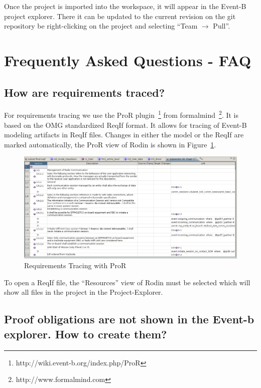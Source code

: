\documentclass[10pt,a4paper]{article}
\begin{document}
Once the project is imported into the workspace, it will appear in the Event-B
project explorer. There it can be updated to the current revision on the git
repository be right-clicking on the project and selecting ``Team $\rightarrow$
Pull''. 

\section{Frequently Asked Questions - FAQ}
\label{sec:faq}

\subsection{How are requirements traced?}
\label{sec:how-are-requirements}

For requirements tracing we use the ProR
plugin~\footnote{http://wiki.event-b.org/index.php/ProR} from
formalmind~\footnote{http://www.formalmind.com}. It is based on the OMG
standardized ReqIf format. It allows for tracing of Event-B modeling artifacts
in ReqIf files. Changes in either the model or the ReqIf are marked
automatically, the ProR view of Rodin is shown in Figure~\ref{fig:req-tracing}.


\begin{figure}[H]
  \centering
  \includegraphics[width=\textwidth]{ReqIfinRodin}
  \caption{Requirements Tracing with ProR}
  \label{fig:req-tracing}
\end{figure}

To open a ReqIf file, the ``Resources'' view of Rodin must be selected which
will show all files in the project in the Project-Explorer.

\subsection{Proof obligations are not shown in the Event-b explorer. How to
  create them?}
\label{sec:proof-oblig-are}
\end{document}
